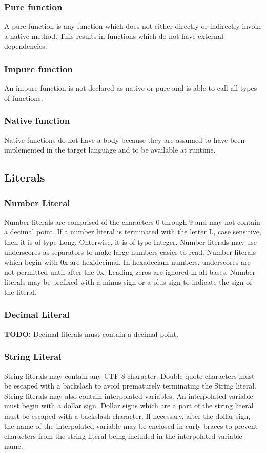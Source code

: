 \documentclass[hidelinks]{article}
\begin{document}
\subsubsection{Pure function}
A pure function is any function which does not either directly or indirectly invoke a native method. This results in functions which do not have external dependencies.
\subsubsection{Impure function}
An impure function is not declared as native or pure and is able to call all types of functions.
\subsubsection{Native function}
Native functions do not have a body because they are assumed to have been implemented in the target language and to be available at runtime.
\subsection{Literals}
\subsubsection{Number Literal}
Number literals are comprised of the characters 0 through 9 and may not contain a decimal point. If a number literal is terminated with the letter L, case sensitive, then it is of type Long. Ohterwise, it is of type Integer. Number literals may use underscores as separators to make large numbers easier to read. Number literals which begin with 0x are hexidecimal. In hexadeciam numbers, underscores are not permitted until after the 0x. Leading zeros are ignored in all bases. Number literals may be prefixed with a minus sign or a plus sign to indicate the sign of the literal.

\subsubsection{Decimal Literal}
\textbf{TODO:} Decimal literals must contain a decimal point.

\subsubsection{String Literal}
String literals may contain any UTF-8 character. Double quote characters must be escaped with a backslash to avoid prematurely terminating the String literal. String literals may also contain interpolated variables. An interpolated variable must begin with a dollar sign. Dollar signs which are a part of the string literal must be escaped with a backslash character. If necessary, after the dollar sign, the name of the interpolated variable may be enclosed in curly braces to prevent characters from the string literal being included in the interpolated variable name.
\end{document}
